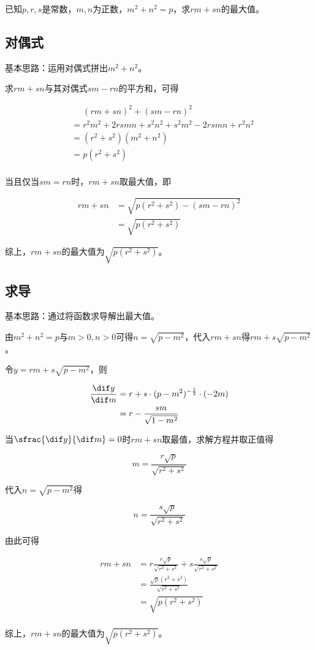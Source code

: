 

已知$p, r, s$是常数，$m, n$为正数，$m^2 + n^2 = p$，求$rm + sn$的最大值。


\subsection{对偶式}

基本思路：运用对偶式拼出$m^2 + n^2$。

求$rm + sn$与其对偶式$sm - rn$的平方和，可得

\begin{align*}
  &\phantom{=} (rm + sn)^2 + (sm - rn)^2 \\
  &= r^2m^2 + 2rsmn + s^2n^2 + s^2m^2 - 2rsmn + r^2n^2 \\
  &= (r^2 + s^2)(m^2 + n^2) \\
  &= p(r^2 + s^2) \\
\end{align*}

当且仅当$sm = rn$时，$rm + sn$取最大值，即

\begin{align*}
  rm + sn &= \sqrt{p(r^2 + s^2) - (sm - rn)^2} \\
  &= \sqrt{p(r^2 + s^2)}
\end{align*}

综上，$rm + sn$的最大值为$\sqrt{p(r^2 + s^2)}$。

\subsection{求导}

基本思路：通过将函数求导解出最大值。

由$m^2 + n^2 = p$与$m > 0, n > 0$可得$n = \sqrt{p - m^2}$，代入$rm + sn$得$rm + s\sqrt{p - m^2}$。

令$y = rm + s\sqrt{p - m^2}$，则

\begin{align*}
  \frac{\dif y}{\dif m} &= r + s\cdot(p - m^2)^{-\frac12}\cdot(-2m) \\
  &= r - \frac{sm}{\sqrt{1 - m^2}} \\
\end{align*}

当$\sfrac{\dif y}{\dif m} = 0$时$rm + sn$取最值，求解方程并取正值得

\[ m = \frac{r\sqrt p}{\sqrt{r^2 + s^2}} \]

代入$n = \sqrt{p - m^2}$得

\[ n = \frac{s\sqrt p}{\sqrt{r^2 + s^2}} \]

由此可得

\begin{align*}
  rm + sn &= r\frac{r\sqrt p}{\sqrt{r^2 + s^2}} + s\frac{s\sqrt p}{\sqrt{r^2 + s^2}} \\
  &= \frac{\sqrt p(r^2 + s^2)}{\sqrt{r^2 + s^2}} \\
  &= \sqrt{p(r^2 + s^2)} \\
\end{align*}

综上，$rm + sn$的最大值为$\sqrt{p(r^2 + s^2)}$。
